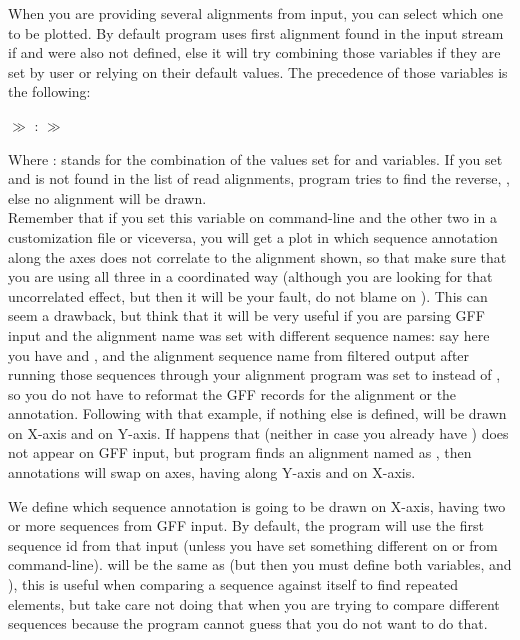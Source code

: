    { \label{sec:seqXseqY} When you are providing several alignments from input, you can select which one to be plotted. By default program uses first alignment found in the input stream if  and  were also not defined, else it will try combining those variables if they are set by user or relying on their default values. The precedence of those variables is the following: \centerline{ $\gg$ : $\gg$ } Where : stands for the combination of the values set for  and  variables. If you set  and  is not found in the list of read alignments, program tries to find the reverse, , else no alignment will be drawn. \\ Remember that if you set this variable on command-line and the other two in a customization file or viceversa, you will get a plot in which sequence annotation along the axes does not correlate to the alignment shown, so that make sure that you are using all three in a coordinated way (although you are looking for that uncorrelated effect, but then it will be your fault, do not blame on {\prog}). This can seem a drawback, but think that it will be very useful if you are parsing GFF input and the alignment name was set with different sequence names: say here you have  and , and the alignment sequence name from filtered output after running those sequences through your alignment program was set to  instead of , so you do not have to reformat the GFF records for the alignment or the annotation. Following with that example, if nothing else is defined,  will be drawn on X-axis and  on Y-axis. If happens that  (neither in case you already have ) does not appear on GFF input, but program finds an alignment named as , then annotations will swap on axes, having  along Y-axis and  on X-axis. }
%
   { We define which sequence annotation is going to be drawn on X-axis, having two or more sequences from GFF input. By default, the program will use the first sequence id from that input (unless you have set something different on  or from command-line).  will be the same as  (but then you must define both variables,  and ), this is useful when comparing a sequence against itself to find repeated elements, but take care not doing that when you are trying to compare different sequences because the program cannot guess that you do not want to do that. }
